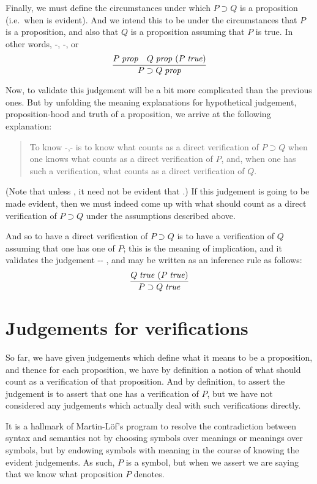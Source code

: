 \documentclass[main.tex]{subfiles}
\begin{document}
Finally, we must define the circumstances under which $P\supset Q$ is a
proposition (i.e.\ when  is evident). And we intend this to
be under the circumstances that $P$ is a proposition, and also that $Q$ is a
proposition assuming that $P$ is true. In other words, \hyp{}{, \hyp{}{}}, or
\[
  \infer{
    \isprop{P\supset Q}
  }{
    \isprop{P} &
    \hyp{\isprop{Q}}{\istrue{P}}
  }
\]

Now, to validate this judgement will be a bit more complicated than the
previous ones. But by unfolding the meaning explanations for hypothetical
judgement, proposition-hood and truth of a proposition, we arrive at the
following explanation:
\begin{quote}
  To know \hyp{}{,\hyp{}{}} is
  to know what counts as a direct verification of $P\supset Q$ when one knows what
  counts as a direct verification of $P$, and, when one has such a verification, what
  counts as a direct verification of $Q$.
\end{quote}

(Note that unless , it need not be evident that .) If
this judgement is going to be made evident, then we must indeed come up with
what should count as a direct verification of $P\supset Q$ under the
assumptions described above.

And so to have a direct verification of $P\supset Q$ is to have a verification
of $Q$ assuming that one has one of $P$; this is the meaning of implication,
and it validates the judgement \hyp{}{\hyp{}{}} , and may be written as an inference rule as
follows:
%
\[
  \infer{
    \istrue{P\supset Q}
  }{
    \hyp{\istrue{Q}}{\istrue{P}}
  }
\]

\section{Judgements for verifications}

So far, we have given judgements which define what it means to be a
proposition, and thence for each proposition, we have by definition a notion of
what should count as a verification of that proposition. And by definition, to
assert the judgement  is to assert that one has a verification of
$P$, but we have not considered any judgements which actually deal with such
verifications directly.

It is a hallmark of Martin-L\"of's program to resolve the contradiction between
syntax and semantics not by choosing symbols over meanings or meanings over
symbols, but by endowing symbols with meaning in the course of knowing the
evident judgements. As such, $P$ is a symbol, but when we assert  we
are saying that we know what proposition $P$ denotes.
\end{document}
